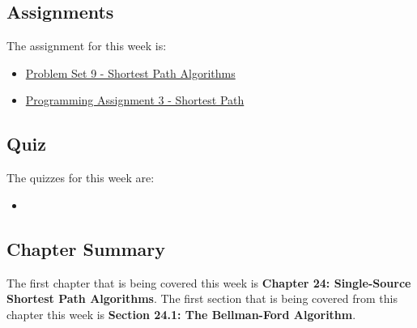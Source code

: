 \subsection{Assignments}

The assignment for this week is:

\begin{itemize}
    \item \href{https://github.com/QuantumCompiler/CU/tree/main/CSPB%203104%20-%20Algorithms/Assignments/Problem%20Sets/Problem%20Set%209%20-%20Shortest%20Path%20Algorithms}{Problem Set 9 - Shortest Path Algorithms}
    \item \href{https://github.com/QuantumCompiler/CU/tree/main/CSPB%203104%20-%20Algorithms/Assignments/Programming%20Assignments/Programming%20Assignment%203%20-%20Shortest%20Path}{Programming Assignment 3 - Shortest Path}
\end{itemize}

\subsection{Quiz}

The quizzes for this week are:

\begin{itemize}
    \item {}
\end{itemize}

\subsection{Chapter Summary}

The first chapter that is being covered this week is \textbf{Chapter 24: Single-Source Shortest Path Algorithms}. The first section that is being covered from this chapter this week is \textbf{Section 24.1: The Bellman-Ford Algorithm}.

